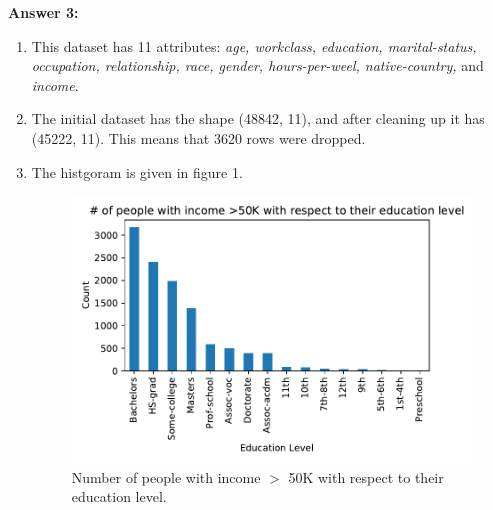 \documentclass[12pt,reqno]{amsart}
\begin{document}
\vspace{20px}

\textbf{Answer 3:} 
\begin{enumerate}[label=\alph*.]
	\item This dataset has 11 attributes: \textit{age, workclass, education, marital-status, occupation, relationship, race, gender, hours-per-weel, native-country,} and \textit{income}. 
 	\item The initial dataset has the shape (48842, 11), and after cleaning up it has (45222, 11). This means that 3620 rows were dropped.
 	\item The histgoram is given in figure 1.
 	\begin{figure}
 	\label{fig:hist}
 	\caption{Number of people with income $>$ 50K with respect to their education level.}
 	\includegraphics[width=\linewidth]{img/histogram.pdf}
	 \end{figure}
	 	 	

\end{enumerate}
\end{document}
